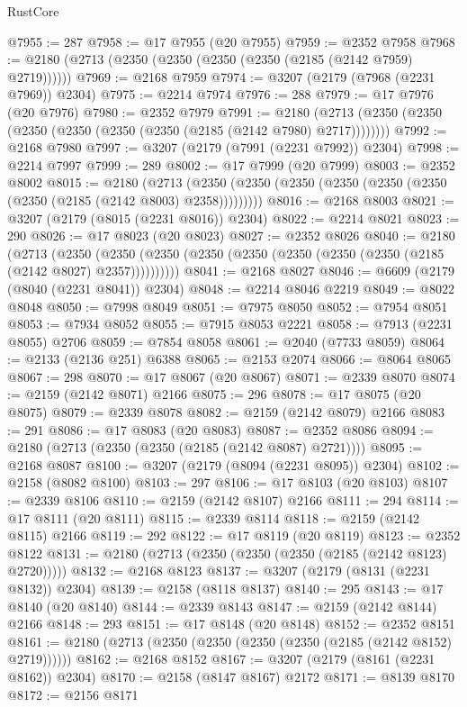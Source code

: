 \begin{lexlean}{RustCore}
\begin{coremodule}
@7955 := 287
@7958 := @17 @7955 (@20 @7955)
@7959 := @2352 @7958
@7968 := @2180 (@2713 (@2350 (@2350 (@2350 (@2350 (@2185 (@2142 @7959) @2719))))))
@7969 := @2168 @7959
@7974 := @3207 (@2179 (@7968 (@2231 @7969)) @2304)
@7975 := @2214 @7974
@7976 := 288
@7979 := @17 @7976 (@20 @7976)
@7980 := @2352 @7979
@7991 := @2180 (@2713 (@2350 (@2350 (@2350 (@2350 (@2350 (@2350 (@2185 (@2142 @7980) @2717))))))))
@7992 := @2168 @7980
@7997 := @3207 (@2179 (@7991 (@2231 @7992)) @2304)
@7998 := @2214 @7997
@7999 := 289
@8002 := @17 @7999 (@20 @7999)
@8003 := @2352 @8002
@8015 := @2180
    (@2713 (@2350 (@2350 (@2350 (@2350 (@2350 (@2350 (@2350 (@2185 (@2142 @8003) @2358)))))))))
@8016 := @2168 @8003
@8021 := @3207 (@2179 (@8015 (@2231 @8016)) @2304)
@8022 := @2214 @8021
@8023 := 290
@8026 := @17 @8023 (@20 @8023)
@8027 := @2352 @8026
@8040 := @2180
    (@2713
      (@2350 (@2350 (@2350 (@2350 (@2350 (@2350 (@2350 (@2350 (@2185 (@2142 @8027) @2357))))))))))
@8041 := @2168 @8027
@8046 := @6609 (@2179 (@8040 (@2231 @8041)) @2304)
@8048 := @2214 @8046 @2219
@8049 := @8022 @8048
@8050 := @7998 @8049
@8051 := @7975 @8050
@8052 := @7954 @8051
@8053 := @7934 @8052
@8055 := @7915 @8053 @2221
@8058 := @7913 (@2231 @8055) @2706
@8059 := @7854 @8058
@8061 := @2040 (@7733 @8059)
@8064 := @2133 (@2136 @251) @6388
@8065 := @2153 @2074
@8066 := @8064 @8065
@8067 := 298
@8070 := @17 @8067 (@20 @8067)
@8071 := @2339 @8070
@8074 := @2159 (@2142 @8071) @2166
@8075 := 296
@8078 := @17 @8075 (@20 @8075)
@8079 := @2339 @8078
@8082 := @2159 (@2142 @8079) @2166
@8083 := 291
@8086 := @17 @8083 (@20 @8083)
@8087 := @2352 @8086
@8094 := @2180 (@2713 (@2350 (@2350 (@2185 (@2142 @8087) @2721))))
@8095 := @2168 @8087
@8100 := @3207 (@2179 (@8094 (@2231 @8095)) @2304)
@8102 := @2158 (@8082 @8100)
@8103 := 297
@8106 := @17 @8103 (@20 @8103)
@8107 := @2339 @8106
@8110 := @2159 (@2142 @8107) @2166
@8111 := 294
@8114 := @17 @8111 (@20 @8111)
@8115 := @2339 @8114
@8118 := @2159 (@2142 @8115) @2166
@8119 := 292
@8122 := @17 @8119 (@20 @8119)
@8123 := @2352 @8122
@8131 := @2180 (@2713 (@2350 (@2350 (@2350 (@2185 (@2142 @8123) @2720)))))
@8132 := @2168 @8123
@8137 := @3207 (@2179 (@8131 (@2231 @8132)) @2304)
@8139 := @2158 (@8118 @8137)
@8140 := 295
@8143 := @17 @8140 (@20 @8140)
@8144 := @2339 @8143
@8147 := @2159 (@2142 @8144) @2166
@8148 := 293
@8151 := @17 @8148 (@20 @8148)
@8152 := @2352 @8151
@8161 := @2180 (@2713 (@2350 (@2350 (@2350 (@2350 (@2185 (@2142 @8152) @2719))))))
@8162 := @2168 @8152
@8167 := @3207 (@2179 (@8161 (@2231 @8162)) @2304)
@8170 := @2158 (@8147 @8167) @2172
@8171 := @8139 @8170
@8172 := @2156 @8171

\end{coremodule}
\end{lexlean}

